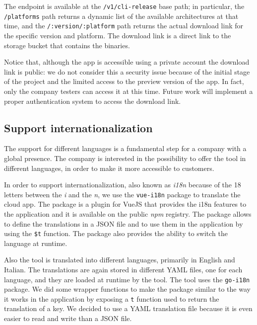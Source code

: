 The endpoint is available at the \texttt{/v1/cli-release} base path; in particular, the \texttt{/platforms} path returns a dynamic list of the available architectures at that time, and the \texttt{/:version/:platform} path returns the actual download link for the specific version and platform. The download link is a direct link to the storage bucket that contains the binaries.

Notice that, although the app is accessible using a private account the download link is public: we do not consider this a security issue because of the initial stage of the project and the limited access to the preview version of the app. In fact, only the company testers can access it at this time. Future work will implement a proper authentication system to access the download link.

\subsection{Support internationalization}

The support for different languages is a fundamental step for a company with a global presence. The company is interested in the possibility to offer the tool in different languages, in order to make it more accessible to customers.

In order to support internationalization, also known as \textit{i18n} because of the 18 letters between the \textit{i} and the \textit{n}, we use the \texttt{vue-i18n} package to translate the cloud app. The package is a plugin for VueJS that provides the i18n features to the application and it is available on the public \textit{npm} registry. The package allows to define the translations in a JSON file and to use them in the application by using the \texttt{\$t} function. The package also provides the ability to switch the language at runtime.

Also the tool is translated into different languages, primarily in English and Italian. The translations are again stored in different YAML files, one for each language, and they are loaded at runtime by the tool. The tool uses the \texttt{go-i18n} package. We did some wrapper functions to make the package similar to the way it works in the application by exposing a \texttt{t} function used to return the translation of a key. We decided to use a YAML translation file because it is even easier to read and write than a JSON file.

